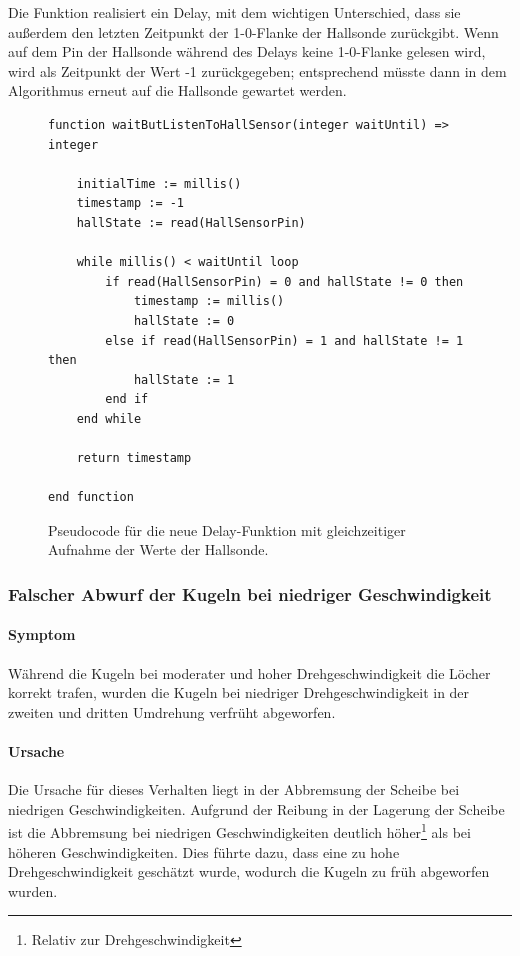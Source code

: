 \documentclass{kis}
\begin{document}
Die Funktion realisiert ein Delay, mit dem wichtigen Unterschied, dass sie außerdem den letzten Zeitpunkt der 1-0-Flanke der Hallsonde zurückgibt. Wenn auf dem Pin der Hallsonde während des Delays keine 1-0-Flanke gelesen wird, wird als Zeitpunkt der Wert -1 zurückgegeben; entsprechend müsste dann in dem Algorithmus erneut auf die Hallsonde gewartet werden.

\begin{figure}
\lstset{basicstyle=\small\ttfamily,tabsize=3}
{\singlespacing
\begin{lstlisting}[frame=single]
function waitButListenToHallSensor(integer waitUntil) => integer
	
	initialTime := millis()
	timestamp := -1
	hallState := read(HallSensorPin)
	
	while millis() < waitUntil loop
		if read(HallSensorPin) = 0 and hallState != 0 then
			timestamp := millis()
			hallState := 0
		else if read(HallSensorPin) = 1 and hallState != 1 then
			hallState := 1
		end if
	end while
	
	return timestamp
	
end function
\end{lstlisting}
}
\caption{Pseudocode für die neue Delay-Funktion mit gleichzeitiger Aufnahme der Werte der Hallsonde.}
\label{fig:pseudo-delay}
\end{figure}

\subsubsection{Falscher Abwurf der Kugeln bei niedriger Geschwindigkeit}
\paragraph{Symptom}
Während die Kugeln bei moderater und hoher Drehgeschwindigkeit die Löcher korrekt trafen, wurden die Kugeln bei niedriger Drehgeschwindigkeit in der zweiten und dritten Umdrehung verfrüht abgeworfen.

\paragraph{Ursache}
Die Ursache für dieses Verhalten liegt in der Abbremsung der Scheibe bei niedrigen Geschwindigkeiten. Aufgrund der Reibung in der Lagerung der Scheibe ist die Abbremsung bei niedrigen Geschwindigkeiten deutlich höher\footnote{Relativ zur Drehgeschwindigkeit} als bei höheren Geschwindigkeiten. Dies führte dazu, dass eine zu hohe Drehgeschwindigkeit geschätzt wurde, wodurch die Kugeln zu früh abgeworfen wurden.
\end{document}
